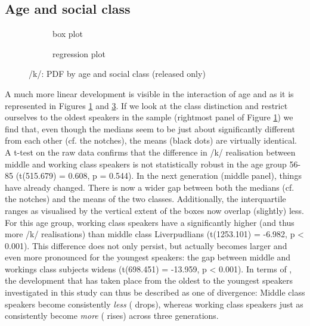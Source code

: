 \subsection{Age and social class}
\label{sec.prod.res.con.k.ageclass}

\begin{figure}[h]
	\centering
	\begin{subfigure}{.49\textwidth}
		\centering
			\resizebox{\linewidth}{!}{} 
		\caption{box plot}
		\label{fig.box.k.ageclass}
	\end{subfigure}
	\begin{subfigure}{.49\textwidth}
		\centering
			\resizebox{\linewidth}{!}{} 
		\caption{regression plot}
		\label{fig.scatter.k.ageclass}
	\end{subfigure}
	\caption{/k/: PDF by age and social class (released only)}
\end{figure}

A much more linear development is visible in the interaction of age and  as it is represented in Figures \ref{fig.box.k.ageclass} and \ref{fig.scatter.k.ageclass}.
If we look at the class distinction and restrict ourselves to the oldest speakers in the sample (rightmost panel of Figure \ref{fig.box.k.ageclass}) we find that, even though the medians seem to be just about significantly different from each other (cf. the notches), the means (black dots) are virtually identical.
A t-test on the raw data confirms that the difference in /k/ realisation between middle and working class speakers is not statistically robust in the age group 56-85 (t(515.679) = 0.608, p = 0.544).
In the next generation (middle panel), things have already changed.
There is now a wider gap between both the medians (cf. the notches) and the means of the two classes.
Additionally, the interquartile ranges as visualised by the vertical extent of the boxes now overlap (slightly) less.
For this age group, working class speakers have a significantly higher  (and thus more  /k/ realisations) than middle class Liverpudlians (t(1253.101) = -6.982, p < 0.001).
This difference does not only persist, but actually becomes larger and even more pronounced for the youngest speakers: the gap between middle and workings class subjects widens (t(698.451) = -13.959, p < 0.001).
In terms of , the development that has taken place from the oldest to the youngest speakers investigated in this study can thus be described as one of divergence: Middle class speakers become consistently \emph{less}  ( drops), whereas working class speakers just as consistently become \emph{more}  ( rises) across three generations.


